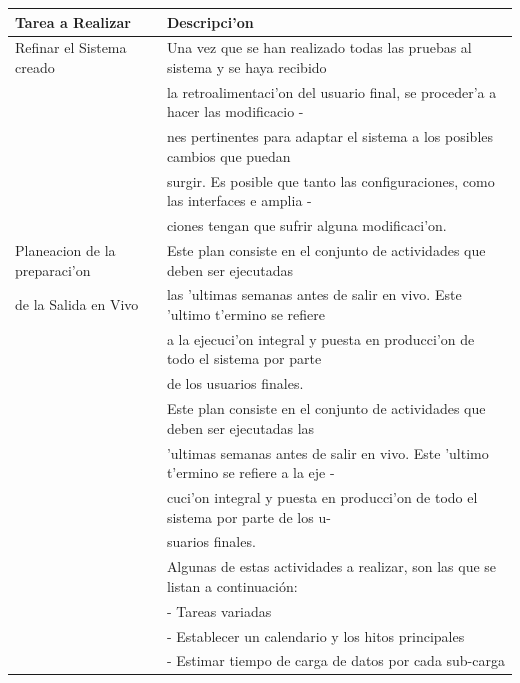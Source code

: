 \begin{table}[H]
\footnotesize
\begin{tabular}{|l|l|}
\hline
\textbf{Tarea a Realizar}  & \textbf{Descripci'on}  \\
\hline
Refinar el Sistema creado & Una vez que se han realizado todas las pruebas al sistema y se haya recibido \\
                                        & la retroalimentaci'on del usuario final, se proceder'a a hacer las modificacio - \\
                                        & nes pertinentes para adaptar el sistema a los posibles cambios que puedan \\
                                        & surgir. Es posible que tanto las configuraciones, como las interfaces e amplia -\\
                                        & ciones tengan que sufrir alguna modificaci'on. \\
\hline
Planeacion de la preparaci'on & Este plan consiste en el conjunto de actividades que deben ser ejecutadas \\ 
de la Salida en Vivo                & las 'ultimas semanas antes de salir en vivo. Este 'ultimo t'ermino se refiere \\
                                              & a la ejecuci'on integral y puesta en producci'on de todo el sistema por parte\\
                                              & de los usuarios finales. \\
                                              & Este plan consiste en el conjunto de actividades que deben ser ejecutadas las\\
                                              & 'ultimas semanas antes de salir en vivo. Este 'ultimo t'ermino se refiere a la eje - \\
                                              & cuci'on integral y puesta en producci'on de todo el sistema por parte de los u- \\
                                              & suarios finales. \\
                                              & 	Algunas de estas actividades a realizar, son las que se listan a continuación: \\ 
											   & - Tareas variadas \\
											   & - Establecer un calendario y los hitos principales \\
											   & - Estimar tiempo de carga de datos por cada sub-carga \\

\end{tabular}
\end{table}
